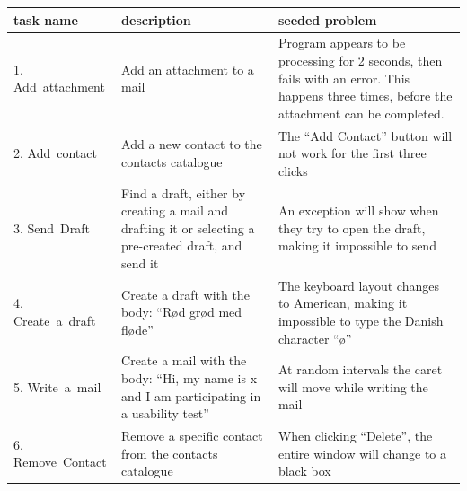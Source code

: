 \begin{table}[H]
  \centering
  \begin{tabular}[c]{|p{60pt}|p{80pt}|p{80pt}|}
    \hline
    task name                         & description                                                                                                                    & seeded problem                                                                                                                                      \\ \hline
    \small{1. Add~attachment}         & \small{Add an attachment to a mail}                                                                                            & \small{Program appears to be processing for 2 seconds, then fails with an error. This happens three times, before the attachment can be completed.} \\ \hline
    \small{2. Add~contact}            & \small{Add a new contact to the contacts catalogue}                                                                            & \small{The ``Add Contact'' button will not work for the first three clicks}                                                                         \\ \hline
    \small{3. Send~Draft}             & \small{Find a draft, either by creating a mail and drafting it or selecting a pre-created draft, and send it}                  & \small{An exception will show when they try to open the draft, making it impossible to send}                                                        \\ \hline
    \small{4. Create~a~draft}         & \small{Create a draft with the body: ``Rød grød med fløde''}                                                                   & \small{The keyboard layout changes to American, making it impossible to type the Danish character ``ø''}                                            \\ \hline
    \small{5. Write~a~mail}           & \small{Create a mail with the body: ``Hi, my name is x and I am participating in a usability test''}                           & \small{At random intervals the caret will move while writing the mail}                                                                              \\ \hline
    \small{6. Remove~Contact}         & \small{Remove a specific contact from the contacts catalogue}                                                                  & \small{When clicking ``Delete'', the entire window will change to a black box}                                                                      \\ \hline

\end{tabular}
\end{table}
